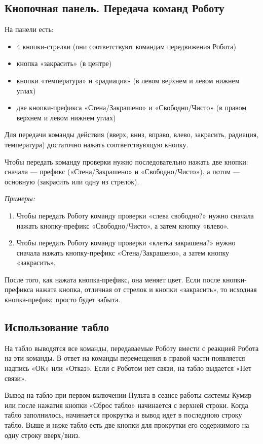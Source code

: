 \subsection{Кнопочная панель. Передача команд Роботу}

На панели есть:
\begin{itemize}
\item 4 кнопки-стрелки (они соответствуют командам передвижения Робота)
\item кнопка «закрасить» (в центре)
\item кнопки «температура» и «радиация» (в левом верхнем и левом нижнем углах)
\item две кнопки-префикса «Стена/Закрашено» и «Свободно/Чисто» (в правом верхнем и левом нижнем углах)
\end{itemize}

Для передачи команды действия (вверх, вниз, вправо, влево, закрасить, радиация, температура) достаточно нажать соответствующую кнопку.

Чтобы передать команду проверки нужно последовательно нажать две кнопки: сначала --- префикс («Стена/Закрашено» и «Свободно/Чисто»), а потом --- основную (закрасить или одну из стрелок). 

\emph{Примеры:}
\begin{enumerate}
\item Чтобы передать Роботу команду проверки «слева свободно?» нужно сначала нажать кнопку-префикс «Свободно/Чисто», а затем кнопку «влево». 
\item Чтобы передать Роботу команду проверки «клетка закрашена?» нужно сначала нажать кнопку-префикс «Стена/Закрашено», а затем кнопку «закрасить».
\end{enumerate}

После того, как нажата кнопка-префикс, она меняет цвет. Если после кнопки-префикса нажата кнопка, отличная от стрелок и кнопки «закрасить», то исходная кнопка-префикс просто будет забыта.

\subsection{Использование табло}

На табло выводятся все команды, передаваемые Роботу вмести с реакцией Робота на эти команды. В ответ на команды перемещения в правой части появляется надпись «ОК» или «Отказ». Если с Роботом нет связи, на табло выдается «Нет связи».

Вывод на табло при первом включении Пульта в сеансе работы системы Кумир или после нажатия кнопки «Сброс табло» начинается с верхней строки. Когда табло заполнилось, начинается прокрутка и вывод идет в последнюю строку табло. Выше и ниже табло есть две кнопки для прокрутки его содержимого на одну строку вверх/вниз.

